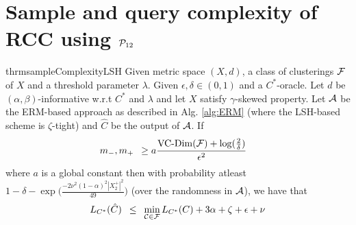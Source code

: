 \section{Sample and query complexity of RCC using $\mathcal P_{12}$}
\begin{restatable}{thrm}{sampleComplexityLSH}
Given metric space $(X, d)$, a class of clusterings $\mathcal F$ of $X$ and a threshold parameter $\lambda$. Given $\epsilon, \delta \in (0, 1)$ and a $C^*$-oracle. Let $d$ be $(\alpha, \beta)$-informative w.r.t $C^*$ and $\lambda$ and let $X$ satisfy $\gamma$-skewed property. Let $\mathcal A$ be the ERM-based approach as described in Alg. \ref{alg:ERM} (where the LSH-based scheme is $\zeta$-tight) and $\hat C$ be the output of $\mathcal A$. If  
\label{thm:sampleComplexityLSH}
\begin{align}
  &m_-, m_+ \enspace \ge a\frac{\operatorname{VC-Dim}({\mathcal F}) + \log(\frac{2}{\delta})}{\epsilon^2} 
\end{align}
where $a$ is a global constant then with probability atleast $1-\delta - \exp\big(\frac{-2\nu^2(1-\alpha)^2|X_2^+|^2}{49}\big)$ (over the randomness in $\mathcal A$), we have that $$L_{C^*}(\hat C) \enspace\le\enspace \min_{\mathcal C \in \mathcal F} L_{C^*}(C) + 3\alpha + \zeta + \epsilon + \nu$$
\end{restatable}
